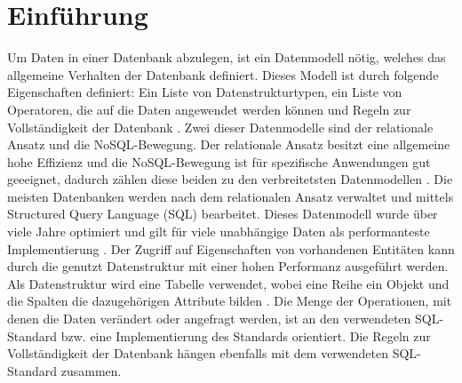 
\chapter{Einführung} %

\label{Kaptiel1} %


\newcommand{\keyword}[1]{\textit{#1}}
\newcommand{\tabhead}[1]{\textbf{#1}}
\newcommand{\code}[1]{\texttt{#1}}
\newcommand{\file}[1]{\texttt{\bfseries#1}}
\newcommand{\option}[1]{\texttt{\itshape#1}}

Um Daten in einer Datenbank abzulegen, ist ein Datenmodell nötig, welches das allgemeine Verhalten der Datenbank definiert. Dieses Modell ist durch folgende Eigenschaften definiert: Ein Liste von Datenstrukturtypen, ein Liste von Operatoren, die auf die Daten angewendet werden können und Regeln zur Vollständigkeit der Datenbank \parencite{codd1981data}. Zwei dieser Datenmodelle sind der relationale Ansatz und die NoSQL-Bewegung. Der relationale Ansatz besitzt eine allgemeine hohe Effizienz und die NoSQL-Bewegung ist für spezifische Anwendungen gut geeeignet, dadurch zählen diese  beiden zu den verbreitetsten Datenmodellen  \parencite{vicknair2010comparison}. \newline
Die meisten Datenbanken werden nach dem relationalen Ansatz verwaltet und mittels Structured Query Language (SQL) bearbeitet. Dieses Datenmodell wurde über viele Jahre optimiert und gilt für viele unabhängige Daten als performanteste Implementierung \parencite{miller2013graph}. Der Zugriff auf Eigenschaften von vorhandenen Entitäten kann durch die genutzt Datenstruktur mit einer hohen Performanz ausgeführt werden. Als Datenstruktur wird eine Tabelle verwendet, wobei eine Reihe ein Objekt  und die Spalten die dazugehörigen Attribute bilden \parencite{tatarinov2002storing}. Die Menge der Operationen, mit denen die Daten verändert oder angefragt werden, ist an den verwendeten SQL-Standard bzw. eine Implementierung des Standards orientiert. Die Regeln zur Vollständigkeit der Datenbank hängen ebenfalls mit dem verwendeten SQL-Standard zusammen.  \newline 
